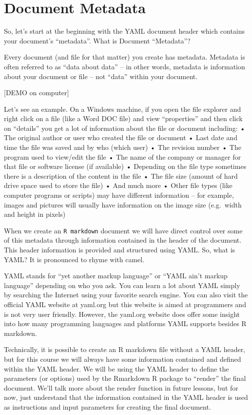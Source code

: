 \documentclass[]{book}
\theoremstyle{definition}
\theoremstyle{definition}
\theoremstyle{definition}
\theoremstyle{remark}
\begin{document}
\section{Document Metadata}\label{document-metadata}

So, let's start at the beginning with the YAML document header which
contains your document's ``metadata''. What is Document ``Metadata''?

Every document (and file for that matter) you create has metadata.
Metadata is often referred to as ``data about data'' -- in other words,
metadata is information about your document or file -- not ``data''
within your document.

{[}DEMO on computer{]}

Let's see an example. On a Windows machine, if you open the file
explorer and right click on a file (like a Word DOC file) and view
``properties'' and then click on ``details'' you get a lot of
information about the file or document including: • The original author
or user who created the file or document • Last date and time the file
was saved and by who (which user) • The revision number • The program
used to view/edit the file • The name of the company or manager for that
file or software license (if available) • Depending on the file type
sometimes there is a description of the content in the file • The file
size (amount of hard drive space used to store the file) • And much more
• Other file types (like computer programs or scripts) may have
different information -- for example, images and pictures will usually
have information on the image size (e.g.~width and height in pixels)

When we create an \texttt{R\ markdown} document we will have direct
control over some of this metadata through information contained in the
header of the document. This header information is provided and
structured using YAML. So, what is YAML? It is pronounced to rhyme with
camel.

YAML stands for ``yet another markup language'' or ``YAML ain't markup
language'' depending on who you ask. You can learn a lot about YAML
simply by searching the Internet using your favorite search engine. You
can also visit the official YAML website at yaml.org but this website is
aimed at programmers and is not very user friendly. However, the
yaml.org website does offer some insight into how many programming
languages and platforms YAML supports besides R markdown.

Technically, it is possible to create an R markdown file without a YAML
header, but for this course we will always have some information
contained and defined within the YAML header. We will be using the YAML
header to define the parameters (or options) used by the Rmarkdown R
package to ``render'' the final document. We'll talk more about the
render function in future lessons, but for now, just understand that the
information contained in the YAML header is used as instructions and
input parameters for creating the final document.
\end{document}
